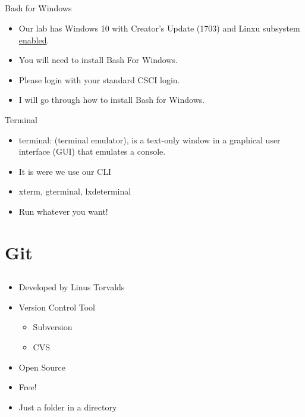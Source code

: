 \documentclass{beamer}
\begin{document}
\subsection{}

\begin{frame}{Bash for Windows}
\begin{itemize}
\item Our lab has Windows 10 with Creator's Update (1703) and Linxu subsystem \underline{enabled}.
\item You will need to install Bash For Windows.
\item Please login with your standard CSCI login.
\item I will go through how to install Bash for Windows.
\end{itemize}
\end{frame}

\begin{frame}{Terminal}
\begin{itemize}
\item terminal: (terminal emulator), is a text-only window in a graphical user interface (GUI) that emulates a console. 
\item It is were we use our CLI
\item xterm, gterminal, lxdeterminal
\item Run whatever you want!
\end{itemize}
\end{frame}

\section{Git}
\subsection{}
\begin{frame}{}
\begin{itemize}
\item Developed by Linus Torvalds
\item Version Control Tool
\begin{itemize}
\item Subversion
\item CVS
\end{itemize}
\item Open Source 
\item Free!
\item Just a folder in a directory
\end{itemize}
\end{frame}
\end{document}

